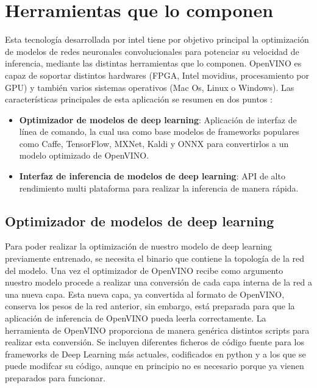 \section{Herramientas que lo componen}\label{sec:herramientas-que-lo-componen}
Esta tecnología desarrollada por intel tiene por objetivo principal la optimización de modelos de redes neuronales convolucionales para potenciar su velocidad de inferencia, mediante las distintas herramientas que lo componen.
OpenVINO es capaz de soportar distintos hardwares (FPGA, Intel movidius, procesamiento por GPU\@) y también varios sistemas operativos (Mac Os, Linux o Windows).
Las características principales de esta aplicación se resumen en dos puntos :
\begin{itemize}
    \item \textbf{Optimizador de modelos de deep learning}: Aplicación de interfaz de línea de comando, la cual usa como base modelos de frameworks populares como Caffe, TensorFlow, MXNet, Kaldi y ONNX para convertirlos a un modelo optimizado de OpenVINO.
    \item \textbf{Interfaz de inferencia de modelos de deep learning}: API de alto rendimiento multi plataforma para realizar la inferencia de manera rápida.
\end{itemize}

\subsection{Optimizador de modelos de deep learning}\label{subsec:optimizador-de-modelos-de-deep-learning}
Para poder realizar la optimización de nuestro modelo de deep learning previamente entrenado, se necesita el binario que contiene la topología de la red del modelo.
Una vez el optimizador de OpenVINO recibe como argumento nuestro modelo procede a realizar una conversión de cada capa interna de la red a una nueva capa.
Esta nueva capa, ya convertida al formato de OpenVINO, conserva los pesos de la red anterior,
sin embargo, está preparada para que la aplicación de inferencia de OpenVINO pueda leerla correctamente.
La herramienta de OpenVINO proporciona de manera genérica distintos scripts para realizar esta conversión.
Se incluyen diferentes ficheros de código fuente para los frameworks de Deep Learning más actuales, codificados en python y a los que se puede modifcar su código, aunque en principio no es necesario porque ya vienen preparados para funcionar.

